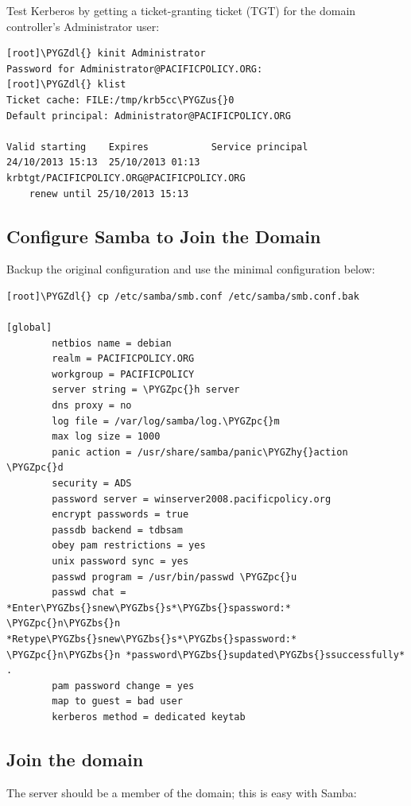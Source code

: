 \documentclass[letterpaper,10pt,english]{sphinxmanual}
\def\PYGZbs{\char`\\}
\def\PYGZus{\char`\_}
\def\PYGZpc{\char`\%}
\def\PYGZdl{\char`\$}
\def\PYGZhy{\char`\-}
\begin{document}
Test Kerberos by getting a ticket-granting ticket (TGT) for the domain
controller's Administrator user:

\begin{Verbatim}[commandchars=\\\{\}]
[root]\PYGZdl{} kinit Administrator
Password for Administrator@PACIFICPOLICY.ORG:
[root]\PYGZdl{} klist
Ticket cache: FILE:/tmp/krb5cc\PYGZus{}0
Default principal: Administrator@PACIFICPOLICY.ORG

Valid starting    Expires           Service principal
24/10/2013 15:13  25/10/2013 01:13  krbtgt/PACIFICPOLICY.ORG@PACIFICPOLICY.ORG
    renew until 25/10/2013 15:13
\end{Verbatim}


\subsection{Configure Samba to Join the Domain}
\label{administrator-guide:configure-samba-to-join-the-domain}
Backup the original configuration and use the minimal configuration below:

\begin{Verbatim}[commandchars=\\\{\}]
[root]\PYGZdl{} cp /etc/samba/smb.conf /etc/samba/smb.conf.bak

[global]
        netbios name = debian
        realm = PACIFICPOLICY.ORG
        workgroup = PACIFICPOLICY
        server string = \PYGZpc{}h server
        dns proxy = no
        log file = /var/log/samba/log.\PYGZpc{}m
        max log size = 1000
        panic action = /usr/share/samba/panic\PYGZhy{}action \PYGZpc{}d
        security = ADS
        password server = winserver2008.pacificpolicy.org
        encrypt passwords = true
        passdb backend = tdbsam
        obey pam restrictions = yes
        unix password sync = yes
        passwd program = /usr/bin/passwd \PYGZpc{}u
        passwd chat = *Enter\PYGZbs{}snew\PYGZbs{}s*\PYGZbs{}spassword:* \PYGZpc{}n\PYGZbs{}n *Retype\PYGZbs{}snew\PYGZbs{}s*\PYGZbs{}spassword:* \PYGZpc{}n\PYGZbs{}n *password\PYGZbs{}supdated\PYGZbs{}ssuccessfully* .
        pam password change = yes
        map to guest = bad user
        kerberos method = dedicated keytab
\end{Verbatim}


\subsection{Join the domain}
\label{administrator-guide:join-the-domain}
The server should be a member of the domain; this is easy with Samba:
\end{document}
